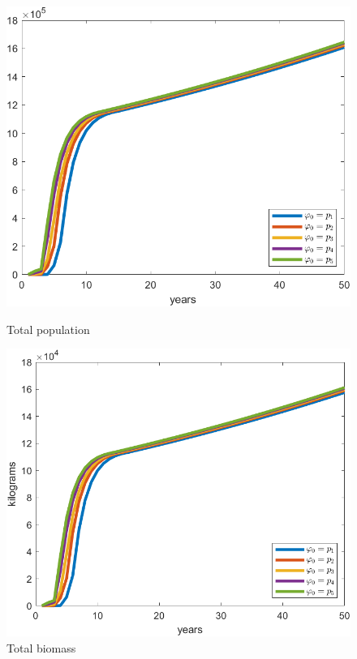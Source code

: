 \begin{figure}[H]
	\centering
	\begin{minipage}{.48\textwidth}
		\includegraphics[width=\linewidth]{Images/F=1000/total_pop_when_f=1000}
		\caption{Total population}
		\label{fig:totalpopwhenf=1000}
	\end{minipage} \quad 
	\centering
	\begin{minipage}{.48\textwidth}
		\includegraphics[width=\linewidth]{Images/F=1000/total_biomass_when_f=1000}
		\caption{Total biomass}
		\label{fig:totalbiomasswhenf=1000}
	\end{minipage}
\end{figure}

